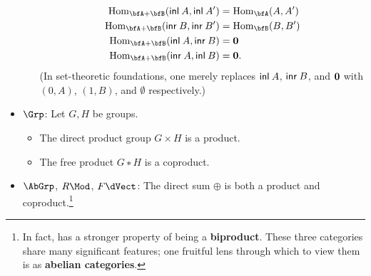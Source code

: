 \documentclass[12pt,twoside]{reedthesis}
\newcommand{\define}[1]{\textbf{#1}} %
\begin{document}
\begin{example}
\begin{itemize}
\begin{itemize}
          \begin{align*}
            \Hom_{\bfA+\bfB}(\apply{\inl}{A}, \apply{\inl}{A'}) &= \Hom_{\bfA}(A,A') \\
            \Hom_{\bfA+\bfB}(\apply{\inr}{B}, \apply{\inr}{B'}) &= \Hom_{\bfB}(B,B') \\
            \Hom_{\bfA+\bfB}(\apply{\inl}{A}, \apply{\inr}{B}) &= \emptytype \\
            \Hom_{\bfA+\bfB}(\apply{\inr}{A}, \apply{\inl}{B}) &= \emptytype.
          \end{align*}
          (In set-theoretic foundations, one merely replaces $\mathsf{inl}\hspace{0.23em} A$,
          $\mathsf{inr}\hspace{0.23em} B$, and $\mathbf{0}$ with $(0,A)$, $(1,B)$, and
          $\emptyset$ respectively.)
      \end{itemize}
    \item $\Grp$: Let $G,H$ be groups.
      \begin{itemize}\renewcommand{\labelitemi}{$∘$}
        \itemsep-0.2em
        \item \vspace{-0.6em} The direct product group $G×H$ is a product.
        \item The free product $G∗H$ is a coproduct.
      \end{itemize}
    \item $\AbGrp$, $R\Mod$, $F\dVect$: The direct sum $⊕$ is both a product and
      coproduct.\footnote{In fact, has a stronger property of being a
      \define{biproduct}. These three categories share many significant
      features; one fruitful lens through which to view them is as
      \define{abelian categories}.} 
  \end{itemize}
\end{example}
\end{document}
